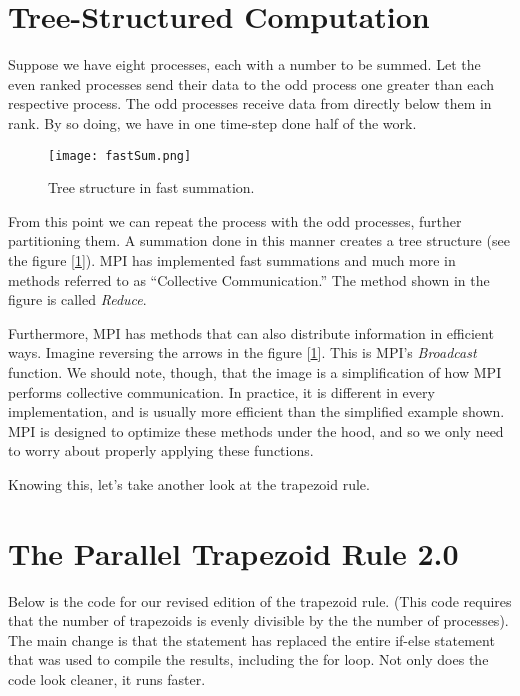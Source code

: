 \section*{Tree-Structured Computation}
  Suppose we have eight processes, each with a number to be summed. Let the even ranked processes send their data to the odd process one greater than each respective process. The odd processes receive data from directly below them in rank. By so doing, we have in one time-step done half of the work.

  \begin{figure}[htbp]
  \centering
  \texttt{[image: fastSum.png]}
  \caption{Tree structure in fast summation.}
  \label{fig:fast_sum}
  \end{figure}


  From this point we can repeat the process with the odd processes, further partitioning them. A summation done in this manner creates a tree structure (see the figure [\ref{fig:fast_sum}]). MPI has implemented fast summations and much more in methods referred to as ``Collective Communication.'' The method shown in the figure is called \emph{Reduce}.

  Furthermore, MPI has methods that can also distribute information in efficient ways. Imagine reversing the arrows in the figure [\ref{fig:fast_sum}]. This is MPI's \emph{Broadcast} function. We should note, though, that the image is a simplification of how MPI performs collective communication. In practice, it is different in every implementation, and is usually more efficient than the simplified example shown. MPI is designed to optimize these methods under the hood, and so we only need to worry about properly applying these functions.

  Knowing this, let's take another look at the trapezoid rule.


\section*{The Parallel Trapezoid Rule 2.0}
  Below is the code for our revised edition of the trapezoid rule. (This code requires that the number of trapezoids is evenly divisible by the the number of processes). The main change is that the statement  has replaced the entire if-else statement that was used to compile the results, including the for loop. Not only does the code look cleaner, it runs faster.


